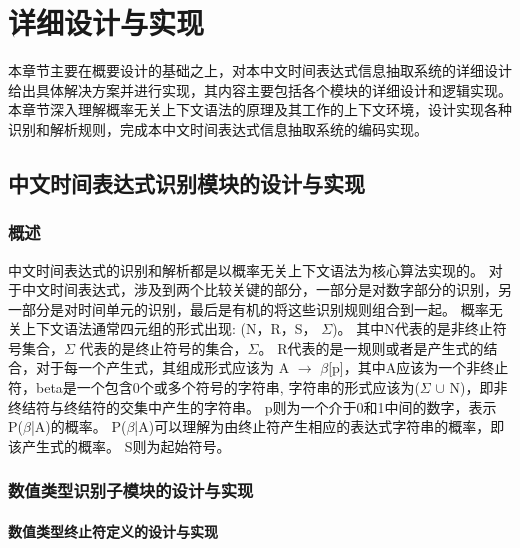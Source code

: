 
\chapter{详细设计与实现}

本章节主要在概要设计的基础之上，对本中文时间表达式信息抽取系统的详细设计给出具体解决方案并进行实现，其内容主要包括各个模块的详细设计和逻辑实现。
本章节深入理解概率无关上下文语法的原理及其工作的上下文环境，设计实现各种识别和解析规则，完成本中文时间表达式信息抽取系统的编码实现。


\section{中文时间表达式识别模块的设计与实现}

\subsection{概述}

中文时间表达式的识别和解析都是以概率无关上下文语法为核心算法实现的。
对于中文时间表达式，涉及到两个比较关键的部分，一部分是对数字部分的识别，另一部分是对时间单元的识别，最后是有机的将这些识别规则组合到一起。
概率无关上下文语法通常四元组的形式出现: (N，R，S， $\varSigma$)。 其中N代表的是非终止符号集合，$\varSigma$ 代表的是终止符号的集合，$\varSigma$。
R代表的是一规则或者是产生式的结合，对于每一个产生式，其组成形式应该为 A $\rightarrow$ $\beta$[p]，其中A应该为一个非终止符，beta是一个包含0个或多个符号的字符串,
字符串的形式应该为($\varSigma$ $\cup$ N)，即非终结符与终结符的交集中产生的字符串。 p则为一个介于0和1中间的数字，表示 P($\beta$|A)的概率。
P($\beta$|A)可以理解为由终止符产生相应的表达式字符串的概率，即该产生式的概率。
S则为起始符号。


\subsection{数值类型识别子模块的设计与实现}

\subsubsection{数值类型终止符定义的设计与实现}

